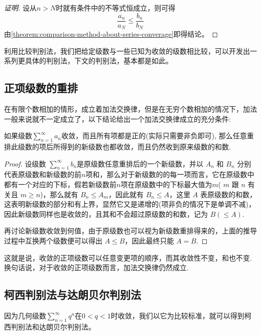 \begin{proof}[证明]
  设从$n>N$时就有条件中的不等式恒成立，则可得
  \[ \frac{a_n}{a_N} \leqslant \frac{b_n}{b_N} \]
  由\autoref{theorem:comparison-method-about-series-converage}即得结论。
\end{proof}

利用比较判别法，我们把给定级数与一些已知为收敛的级数相比较，可以开发出一系列更具体的判别法，下文的判别法，基本都是如此。


\subsection{正项级数的重排}
\label{sec:re-order-of-positive-series}


在有限个数相加的情形，成立着加法交换律，但是在无穷个数相加的情况下，加法一般来说就不一定成立了，以下结论给出一个加法交换律成立的充分条件:
\begin{theorem}
  \label{commutativity-of-positive-series}
  如果级数$\sum_{n=1}^{\infty}a_n$收敛，而且所有项都是正的(实际只需要非负即可), 那么任意重排此级数的项后所得到的新级数也都收敛，而且仍然收到原来级数的和数.
\end{theorem}

\begin{proof}
  设级数 $\sum_{n=1}^{\infty}b_n$是原级数任意重排后的一个新级数，并以 $A_n$ 和 $B_n$ 分别代表原级数和新级数的前$n$项和，那么对于新级数的的每一项而言，它在原级数中都有一个对应的下标，假若新级数前$n$项在原级数中的下标最大值为$m$( $m$ 跟 $n$ 有关且 $m \geqslant n$)，那么就有 $B_n \leqslant A_m$，因此就有 $B_n \leqslant A$，这里 $A$ 表原级数的和数，这表明新级数的部分和有上界，显然它又是递增的(项非负的情况下是单调不减)，因此新级数同样也是收敛的，且其和不会超过原级数的和数，记为 $B(\leqslant A)$.

  再讨论新级数收敛到何值，由于原级数也可以视为新级数重排得来的，上面的推导过程中互换两个级数便可以得出 $A \leqslant B$，因此最终只能 $A=B$.
\end{proof}
这就是说，收敛的正项级数可以任意变更项的顺序，而其收敛性不变，和也不变. 换句话说，对于收敛的正项级数而言，加法交换律仍然成立.




\subsection{柯西判别法与达朗贝尔判别法}
\label{sec:cauchy-dalembert-method-aboud-series-converage}

因为几何级数$\sum_{n=1}^{\infty}q^n$在$0<q<1$时收敛，我们以它为比较标准，就可以得到柯西判别法和达朗贝尔判别法。


